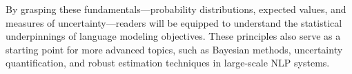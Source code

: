 \noindent
By grasping these fundamentals—probability distributions, expected values, and measures of uncertainty—readers will be equipped to understand the statistical underpinnings of language modeling objectives. These principles also serve as a starting point for more advanced topics, such as Bayesian methods, uncertainty quantification, and robust estimation techniques in large-scale NLP systems.
